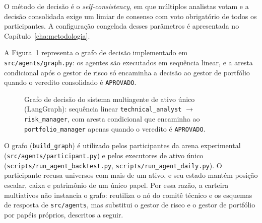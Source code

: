 \documentclass{eic-bcc-tcc}
\begin{document}
O método de decisão é o \textit{self-consistency}, em que múltiplos analistas votam e a decisão consolidada exige um limiar de consenso com voto obrigatório de todos os participantes. A configuração congelada desses parâmetros é apresentada no Capítulo~\ref{cha:metodologia}.

A Figura~\ref{fig:grafo-langgraph} representa o grafo de decisão implementado em \texttt{src/agents/graph.py}: os agentes são executados em sequência linear, e a aresta condicional após o gestor de risco só encaminha a decisão ao gestor de portfólio quando o veredito consolidado é \texttt{APROVADO}.

\begin{figure}[htbp]
\centering
{}
\caption{Grafo de decisão do sistema multiagente de ativo único (LangGraph): sequência linear \texttt{technical\_analyst} $\rightarrow$ \texttt{risk\_manager}, com aresta condicional que encaminha ao \texttt{portfolio\_manager} apenas quando o veredito é \texttt{APROVADO}.}
\label{fig:grafo-langgraph}
\end{figure}

O grafo (\texttt{build\_graph}) é utilizado pelos participantes da arena experimental (\texttt{src/agents/participant.py}) e pelos executores de ativo único (\texttt{scripts/run\_agent\_backtest.py}, \texttt{scripts/run\_agent\_daily.py}). O participante recusa universos com mais de um ativo, e seu estado mantém posição escalar, caixa e patrimônio de um único papel. Por essa razão, a carteira multiativos não instancia o grafo: reutiliza o nó do comitê técnico e os esquemas de resposta de \texttt{src/agents}, mas substitui o gestor de risco e o gestor de portfólio por papéis próprios, descritos a seguir.
\end{document}
